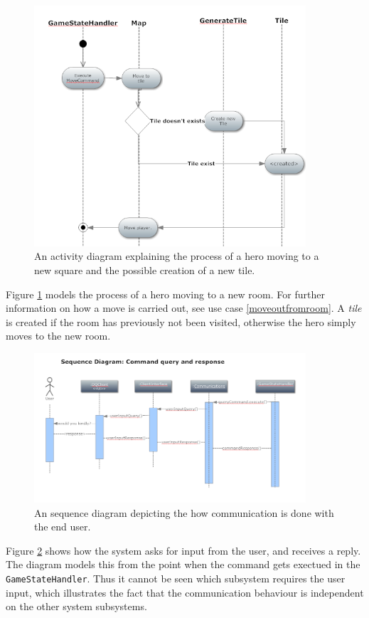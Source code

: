 \begin{figure}[h]
\center
\includegraphics[width=0.9\textwidth]{diagrams/moveActivityDiagram.png}
\caption{An activity diagram explaining the process of a hero moving to a new square and the possible creation of a new tile.}
\label{fig:move_activity_diagram}
\end{figure}

Figure \ref{fig:move_activity_diagram} models the process of a hero moving to a new room. For further information on how a move is carried out, see use case \ref{moveoutfromroom}. A \emph{tile} is created if the room has previously not been visited, otherwise the hero simply moves to the new room.

\begin{figure}[h]
\center
\includegraphics[width=0.9\textwidth]{diagrams/moveCommandSequenceDiagram.png}
\caption{An sequence diagram depicting the how communication is done with the end user.}
\label{fig:randsequence}
\end{figure}

Figure \ref{fig:randsequence} shows how the system asks for input from the user, and receives a reply. The diagram models this from the point when the command gets exectued in the \texttt{GameStateHandler}. Thus it cannot be seen which subsystem requires the user input, which illustrates the fact that the communication behaviour is independent on the other system subsystems.
